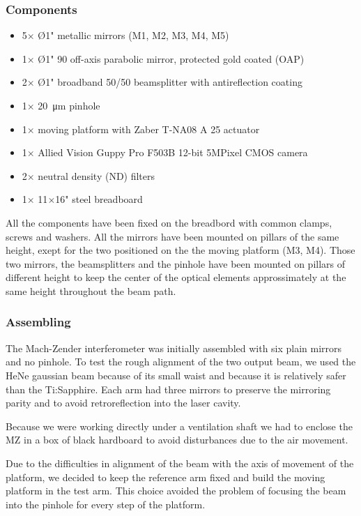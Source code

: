 \documentclass[12pt,a4paper,twoside]{article}
\begin{document}
\subsubsection*{Components}
\begin{itemize}
	\item 5$\times$ Ø1" metallic mirrors (M1, M2, M3, M4, M5)
	\item 1$\times$ Ø1" 90 off-axis parabolic mirror, protected gold coated (OAP)
	\item 2$\times$ Ø1" broadband 50/50 beamsplitter with antireflection coating
	\item 1$\times$ \SI{20}{\um} pinhole
	\item 1$\times$ moving platform with Zaber T-NA08 A 25 actuator
	\item 1$\times$ Allied Vision Guppy Pro F503B 12-bit 5MPixel CMOS camera
	\item 2$\times$ neutral density (ND) filters
	\item 1$\times$ 11$\times$16" steel breadboard
\end{itemize}
All the components have been fixed on the breadbord with common clamps, screws and washers.
All the mirrors have been mounted on pillars of the same height, exept for the two positioned on the the moving platform (M3, M4).
Those two mirrors, the beamsplitters and the pinhole have been mounted on pillars of different height to keep the center of the optical elements approssimately at the same height throughout the beam path.

\subsubsection*{Assembling}
The Mach-Zender interferometer was initially assembled with six plain mirrors and no pinhole.
To test the rough alignment of the two output beam, we used the HeNe gaussian beam because of its small waist and because it is relatively safer than the Ti:Sapphire.
Each arm had three mirrors to preserve the mirroring parity and to avoid retroreflection into the laser cavity.

Because we were working directly under a ventilation shaft we had to enclose the MZ in a box of black hardboard to avoid disturbances due to the air movement.

Due to the difficulties in alignment of the beam with the axis of movement of the platform, we decided to keep the reference arm fixed and build the moving platform in the test arm.
This choice avoided the problem of focusing the beam into the pinhole for every step of the platform.
\end{document}
